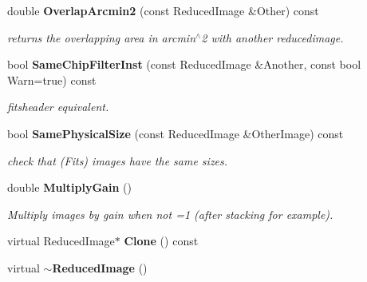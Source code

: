 \begin{CompactItemize}
\item 
{}
double {\bf Overlap\-Arcmin2} (const Reduced\-Image \&Other) const\label{class_reducedimage_a126}

\begin{CompactList}\small\item\em returns the overlapping area in arcmin$^\wedge$2 with another reducedimage.\item\end{CompactList}\item 
{}
bool {\bf Same\-Chip\-Filter\-Inst} (const Reduced\-Image \&Another, const bool Warn=true) const\label{class_reducedimage_a127}

\begin{CompactList}\small\item\em fitsheader equivalent.\item\end{CompactList}\item 
{}
bool {\bf Same\-Physical\-Size} (const Reduced\-Image \&Other\-Image) const\label{class_reducedimage_a128}

\begin{CompactList}\small\item\em check that (Fits) images have the same sizes.\item\end{CompactList}\item 
{}
double {\bf Multiply\-Gain} ()\label{class_reducedimage_a129}

\begin{CompactList}\small\item\em Multiply images by gain when not =1 (after stacking for example).\item\end{CompactList}\item 
{}
virtual Reduced\-Image$\ast$ {\bf Clone} () const\label{class_reducedimage_a130}

\item 
{}
virtual {\bf $\sim$Reduced\-Image} ()\label{class_reducedimage_a131}

\end{CompactItemize}
